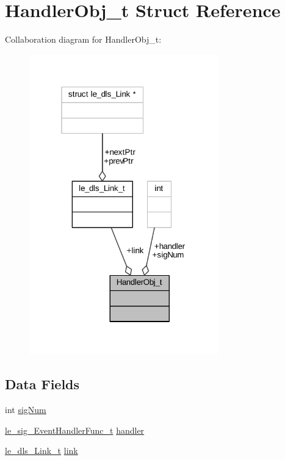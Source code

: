 \hypertarget{struct_handler_obj__t}{}\section{Handler\+Obj\+\_\+t Struct Reference}
\label{struct_handler_obj__t}


Collaboration diagram for Handler\+Obj\+\_\+t\+:
\nopagebreak
\begin{figure}[H]
\begin{center}
\leavevmode
\includegraphics[width=232pt]{struct_handler_obj__t__coll__graph}
\end{center}
\end{figure}
\subsection*{Data Fields}
\begin{DoxyCompactItemize}
\item 
int \hyperlink{struct_handler_obj__t_a5a97b3cd363ddafc6d64269cb7eb0583}{sig\+Num}
\item 
\hyperlink{le__signals_8h_a89301bf64254cdb071c5277c7762f32d}{le\+\_\+sig\+\_\+\+Event\+Handler\+Func\+\_\+t} \hyperlink{struct_handler_obj__t_ae814539bf083e17491f4d13cb5bc86c5}{handler}
\item 
\hyperlink{structle__dls___link__t}{le\+\_\+dls\+\_\+\+Link\+\_\+t} \hyperlink{struct_handler_obj__t_a66e0287475c07f949184bb347c70ddbb}{link}
\end{DoxyCompactItemize}


